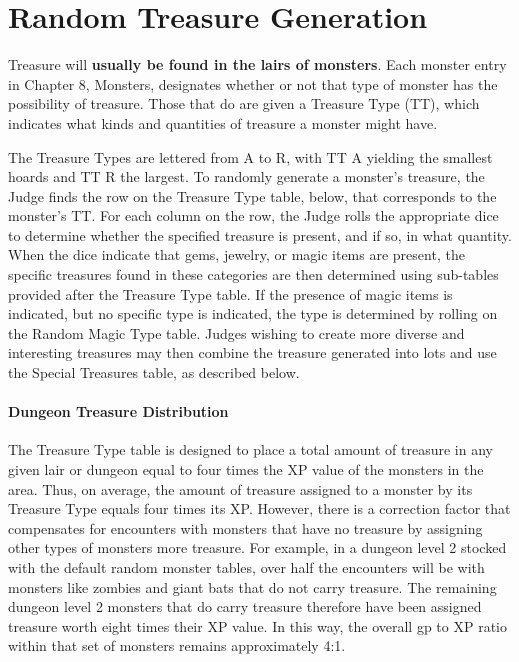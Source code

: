 
\section{Random Treasure Generation}
\begin{multicols}{2}



Treasure will \textbf{usually be found in the lairs of monsters}. Each monster entry in Chapter 8, Monsters, designates whether or not that type of monster has the possibility of treasure. Those that do are given a Treasure Type (TT), which indicates what kinds and quantities of treasure a monster might have.

The Treasure Types are lettered from A to R, with TT A yielding the smallest hoards and TT R the largest. To randomly generate a monster’s treasure, the Judge finds the row on the Treasure Type table, below, that corresponds to the monster’s TT. For each column on the row, the Judge rolls the appropriate dice to determine whether the specified treasure is present, and if so, in what quantity. When the dice indicate that gems, jewelry, or magic items are present, the specific treasures found in these categories are then determined using sub-tables provided after the Treasure Type table. If the presence of magic items is indicated, but no specific type is indicated, the type is determined by rolling on the Random Magic Type table. Judges wishing to create more diverse and interesting treasures may then combine the treasure generated into lots and use the Special Treasures table, as described below.

\paragraph{Dungeon Treasure Distribution} The Treasure Type table is designed to place a total amount of treasure in any given lair or dungeon equal to four times the XP value of the monsters in the area. Thus, on average, the amount of treasure assigned to a monster by its Treasure Type equals four times its XP. However, there is a correction factor that compensates for encounters with monsters that have no treasure by assigning other types of monsters more treasure. For example, in a dungeon level 2 stocked with the default random monster tables, over half the encounters will be with monsters like zombies and giant bats that do not carry treasure. The remaining dungeon level 2 monsters that do carry treasure therefore have been assigned treasure worth eight times their XP value. In this way, the overall gp to XP ratio within that set of monsters remains approximately 4:1.


\end{multicols}
